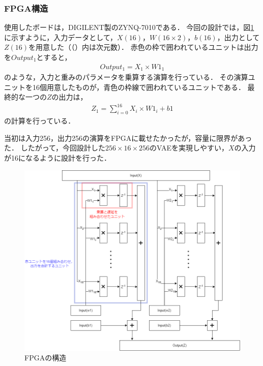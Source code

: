 \documentclass[paper]{ieicej}
\begin{document}
\subsubsection{FPGA構造}\label{2.2.4}
使用したボードは，DIGILENT製のZYNQ-7010である．
今回の設計では，図\ref{fig:2-2-3-1}に示すように，入力データとして，$X(16)$，$W(16\times2)$，$b(16)$，出力として$Z(16)$を用意した（（）内は次元数）．
赤色の枠で囲われているユニットは出力を$Output_1$とすると，
\begin{align}
  Output_1 = X_1 \times W1_1
\end{align}
のような，入力と重みのパラメータを乗算する演算を行っている．
その演算ユニットを16個用意したものが，青色の枠線で囲われているユニットである．
最終的な一つの$Z$の出力は，
\begin{align}
  Z_1 = \sum_{i = 0}^{16} X_i \times W1_i + b1
\end{align}
の計算を行っている．

当初は入力256，出力256の演算をFPGAに載せたかったが，容量に限界があった．
したがって，今回設計した$256\times16\times256$のVAEを実現しやすい，$X$の入力が16になるように設計を行った．

\begin{figure}[tb]
  \begin{center}
    \includegraphics[width=0.98\columnwidth]{figures/FPGA_1.png}
  \end{center}
  \caption{FPGAの構造}
  \label{fig:2-2-3-1}
\end{figure}
\end{document}

